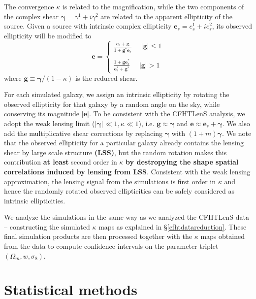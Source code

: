 \documentclass[reprint,aps,prd,superscriptaddress,showkeys,showpacs]{revtex4-1}
\begin{document}
The convergence $\kappa$ is related to
the magnification, while the two components of the complex shear
$\pmb{\gamma}=\gamma^1 + i\gamma^2$ are related to the apparent
ellipticity of the source. Given a source with intrinsic complex
ellipticity $\mathbf{e}_s=e^1_s + ie^2_s$, its observed ellipticity
will be modified to
\begin{equation}
\mathbf{e} = 
\begin{cases}
\frac{\mathbf{e}_s+\mathbf{g}}{1+\mathbf{g}^*\mathbf{e}_s} \,\,\,\,\,\,\,\, \vert \mathbf{g}\vert \leq 1 \\ \\
\frac{1+\mathbf{ge}_s^*}{\mathbf{e}_s^* + \mathbf{g}^*} \,\,\,\,\,\,\,\, \vert \mathbf{g}\vert > 1
\end{cases}
\end{equation}
where $\mathbf{g} \equiv \pmb{\gamma}/(1-\kappa)$ is the reduced shear. 

For each simulated galaxy, we assign an intrinsic ellipticity by
rotating the observed ellipticity for that galaxy by a random angle on
the sky, while conserving its magnitude $\vert\mathbf{e}\vert$. To be
consistent with the CFHTLenS analysis, we adopt the weak lensing limit
($\vert\pmb{\gamma}\vert\ll1,\kappa\ll1$), i.e.
$\mathbf{g}\approx\pmb{\gamma}$ and $\mathbf{e}\approx
\mathbf{e}_s+\pmb{\gamma}$. We also add the multiplicative shear
corrections by replacing $\pmb{\gamma}$ with $(1+m)\pmb{\gamma}$. We
note that the observed ellipticity for a particular galaxy already
contains the lensing shear by large scale structure \textbf{(LSS)}, but the random
rotation makes this contribution \textbf{at least} second order in $\kappa$ \textbf{by destropying the shape spatial correlations induced by lensing from LSS}. Consistent with the weak lensing approximation, the lensing signal from the
simulations is first order in $\kappa$ and hence the randomly rotated
observed ellipticities can be safely considered as intrinsic
ellipticities. 

We analyze the simulations in the same way as we analyzed the CFHTLenS
data -- constructing the simulated $\kappa$ maps as explained in
\S\ref{cfhtdatareduction}. These final simulation products are then
processed together with the $\kappa$ maps obtained from the data to
compute confidence intervals on the parameter triplet
$(\Omega_m,w,\sigma_8)$.



\section{Statistical methods}
\end{document}
